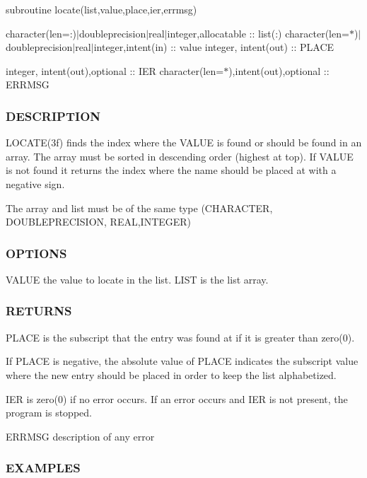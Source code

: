 subroutine locate(list,value,place,ier,errmsg)

character(len=\+:)$\vert$doubleprecision$\vert$real$\vert$integer,allocatable \+:\+: list(\+:) character(len=$\ast$)$\vert$doubleprecision$\vert$real$\vert$integer,intent(in) \+:\+: value integer, intent(out) \+:\+: P\+L\+A\+CE

integer, intent(out),optional \+:\+: I\+ER character(len=$\ast$),intent(out),optional \+:\+: E\+R\+R\+M\+SG

\subsubsection*{D\+E\+S\+C\+R\+I\+P\+T\+I\+ON}

\begin{DoxyVerb}LOCATE(3f) finds the index where the VALUE is found or should
be found in an array. The array must be sorted in descending
order (highest at top). If VALUE is not found it returns the index
where the name should be placed at with a negative sign.

The array and list must be of the same type (CHARACTER, DOUBLEPRECISION,
REAL,INTEGER)
\end{DoxyVerb}


\subsubsection*{O\+P\+T\+I\+O\+NS}

\begin{DoxyVerb}VALUE         the value to locate in the list.
LIST          is the list array.
\end{DoxyVerb}


\subsubsection*{R\+E\+T\+U\+R\+NS}

P\+L\+A\+CE is the subscript that the entry was found at if it is greater than zero(0).

If P\+L\+A\+CE is negative, the absolute value of P\+L\+A\+CE indicates the subscript value where the new entry should be placed in order to keep the list alphabetized.

I\+ER is zero(0) if no error occurs. If an error occurs and I\+ER is not present, the program is stopped.

E\+R\+R\+M\+SG description of any error

\subsubsection*{E\+X\+A\+M\+P\+L\+ES}

